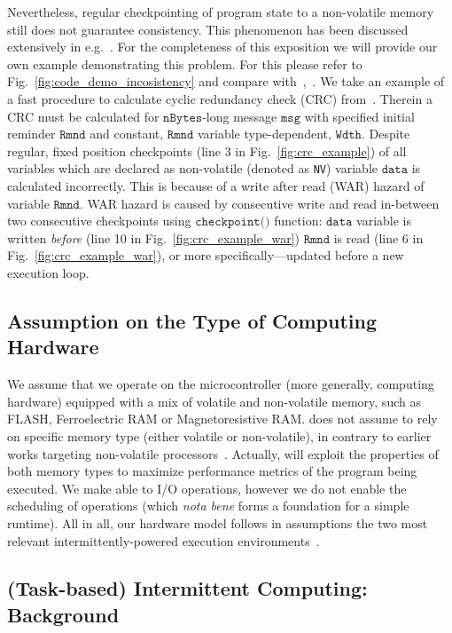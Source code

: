 Nevertheless, regular checkpointing of program state to a non-volatile memory still does not guarantee consistency. This phenomenon has been discussed extensively in e.g.~\cite{chain,alpaca}. For the completeness of this exposition we will provide our own example demonstrating this problem. For this please refer to Fig.~\ref{fig:code_demo_incosistency} and compare with~\cite[Sec 2.3]{alpaca},~\cite[Sec. 2.1]{chain}. We take an example of a fast procedure to calculate cyclic redundancy check (CRC) from~\cite{hicks_mibench2_2016}. Therein a CRC must be calculated for $\texttt{nBytes}$-long message $\texttt{msg}$ with specified initial reminder $\texttt{Rmnd}$ and constant, $\texttt{Rmnd}$ variable type-dependent, $\texttt{Wdth}$. Despite regular, fixed position checkpoints (line 3 in Fig.~\ref{fig:crc_example}) of all variables which are declared as non-volatile (denoted as \texttt{NV}) variable $\texttt{data}$ is calculated incorrectly. This is because of a write after read (WAR) hazard of variable $\texttt{Rmnd}$. WAR hazard is caused by consecutive write and read in-between two consecutive checkpoints using $\texttt{checkpoint()}$ function: $\texttt{data}$ variable is written \emph{before} (line 10 in Fig.~\ref{fig:crc_example_war}) $\texttt{Rmnd}$ is read (line 6 in Fig.~\ref{fig:crc_example_war}), or more specifically---updated before a new execution loop. 

\subsection{Assumption on the Type of Computing Hardware}
\label{sec:background_hardware}

We assume that we operate on the microcontroller (more generally, computing hardware) equipped with a mix of volatile and non-volatile memory, such as FLASH, Ferroelectric RAM or Magnetoresistive RAM. \sys does not assume to rely on specific memory type (either volatile or non-volatile), in contrary to earlier works targeting non-volatile processors~\cite{su_date_2017,ratchet,quickrecall,nvp}. Actually, \sys will exploit the properties of both memory types to maximize performance metrics of the program being executed. We make \sys able to I/O operations, however we do not enable the scheduling of operations (which \emph{nota bene} forms a foundation for a simple runtime). All in all, our hardware model follows in assumptions the two most relevant intermittently-powered execution environments~\cite{alpaca,chain}.

\subsection{(Task-based) Intermittent Computing: Background}

